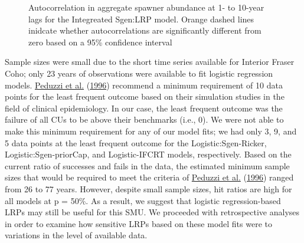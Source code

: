 \documentclass[11pt]{book}
\begin{document}
\begin{figure}[htb]

{\centering {} 

}

\caption{Autocorrelation in aggregate spawner abundance at 1- to 10-year lags for the Integreated Sgen:LRP model. Orange dashed lines inidcate whether autocorrelations are significantly different from zero based on a 95\% confidence interval}\label{fig:coho-logisticACF-IM}
\end{figure}
Sample sizes were small due to the short time series available for Interior Fraser Coho; only 23 years of observations were available to fit logistic regression models. \protect\hyperlink{ref-peduzziSimulationStudyNumber1996}{Peduzzi et al.} (\protect\hyperlink{ref-peduzziSimulationStudyNumber1996}{1996}) recommend a minimum requirement of 10 data points for the least frequent outcome based on their simulation studies in the field of clinical epidemiology. In our case, the least frequent outcome was the failure of all CUs to be above their benchmarks (i.e., 0). We were not able to make this minimum requirement for any of our model fits; we had only 3, 9, and 5 data points at the least frequent outcome for the Logistic:Sgen-Ricker, Logistic:Sgen-priorCap, and Logistic-IFCRT models, respectively. Based on the current ratio of successes and fails in the data, the estimated minimum sample sizes that would be required to meet the criteria of \protect\hyperlink{ref-peduzziSimulationStudyNumber1996}{Peduzzi et al.} (\protect\hyperlink{ref-peduzziSimulationStudyNumber1996}{1996}) ranged from 26 to 77 years. However, despite small sample sizes, hit ratios are high for all models at p = 50\%. As a result, we suggest that logistic regression-based LRPs may still be useful for this SMU. We proceeded with retrospective analyses in order to examine how sensitive LRPs based on these model fits were to variations in the level of available data.
\end{document}
